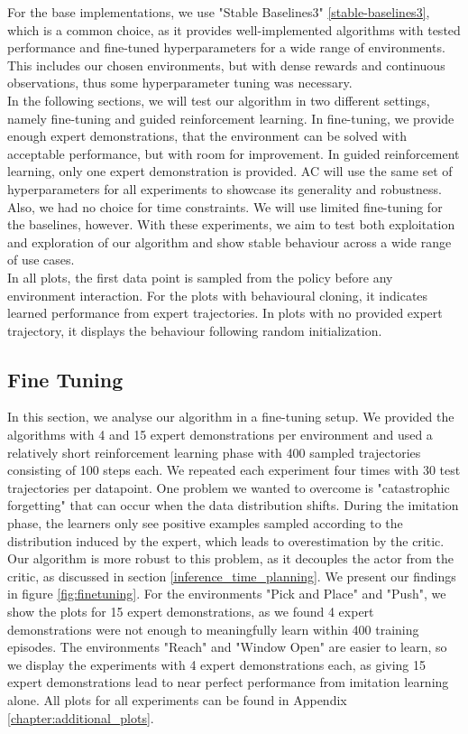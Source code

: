 For the base implementations, we use "Stable Baselines3" \ref{stable-baselines3}, which is a common choice, as it provides well-implemented algorithms with tested
performance and fine-tuned hyperparameters for a wide range of environments. This includes our chosen environments, but with dense rewards and continuous observations,
thus some hyperparameter tuning was necessary. \\

In the following sections, we will test our algorithm in two different settings, namely fine-tuning and guided reinforcement learning. In fine-tuning, we provide
enough expert demonstrations, that the environment can be solved with acceptable performance, but with room for improvement. In guided reinforcement learning,
only one expert demonstration is provided. AC will use the same set of hyperparameters for all experiments to showcase its generality and robustness. Also, we had no choice for time constraints.
We will use limited fine-tuning for the baselines, however.
With these experiments, we aim to test both exploitation and exploration of our algorithm and show stable
behaviour across a wide range of use cases. \\

In all plots, the first data point is sampled from the policy before any environment interaction. For the plots with behavioural cloning, it indicates learned performance from expert trajectories.
In plots with no provided expert trajectory, it displays the behaviour following random initialization.


\subsection{Fine Tuning}
\label{sec:fine_tuning}
In this section, we analyse our algorithm in a fine-tuning setup. We provided the algorithms with 4 and 15 expert demonstrations per 
environment and used a relatively short reinforcement learning phase with 400 sampled trajectories consisting of 100 steps each. We 
repeated each experiment four times with 30 test trajectories per datapoint. One problem we wanted to overcome is "catastrophic forgetting" 
that can occur when the data distribution shifts. During the imitation phase, the learners only see positive examples sampled according to 
the distribution induced by the expert, which leads to overestimation by the critic. Our algorithm is more robust to this problem, as it 
decouples the actor from the critic, as discussed in section \ref{inference_time_planning}. We present our findings in figure \ref{fig:finetuning}. 
For the environments "Pick and Place" and "Push", we show the plots for 15 expert demonstrations, as we found 4 expert demonstrations were not 
enough to meaningfully learn within 400 training episodes. The environments "Reach" and "Window Open" are easier to learn, so we display the 
experiments with 4 expert demonstrations each, as giving 15 expert demonstrations lead to near perfect performance from imitation learning alone. 
All plots for all experiments can be found in Appendix \ref{chapter:additional_plots}.\\

